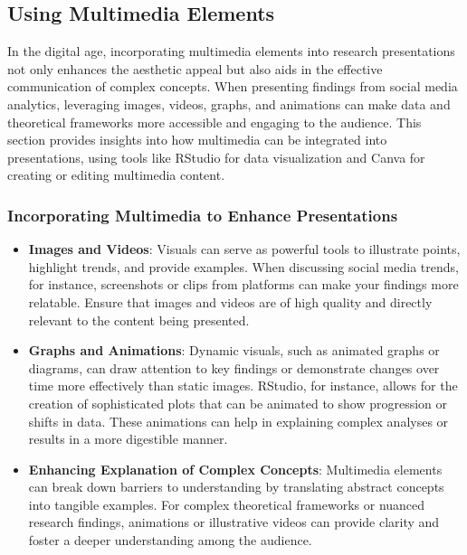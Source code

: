 \documentclass[
]{book}
\begin{document}
\hypertarget{using-multimedia-elements}{%
\subsection*{Using Multimedia Elements}\label{using-multimedia-elements}}

In the digital age, incorporating multimedia elements into research presentations not only enhances the aesthetic appeal but also aids in the effective communication of complex concepts. When presenting findings from social media analytics, leveraging images, videos, graphs, and animations can make data and theoretical frameworks more accessible and engaging to the audience. This section provides insights into how multimedia can be integrated into presentations, using tools like RStudio for data visualization and Canva for creating or editing multimedia content.

\hypertarget{incorporating-multimedia-to-enhance-presentations}{%
\subsubsection{Incorporating Multimedia to Enhance Presentations}\label{incorporating-multimedia-to-enhance-presentations}}

\begin{itemize}
\item
  \textbf{Images and Videos}: Visuals can serve as powerful tools to illustrate points, highlight trends, and provide examples. When discussing social media trends, for instance, screenshots or clips from platforms can make your findings more relatable. Ensure that images and videos are of high quality and directly relevant to the content being presented.
\item
  \textbf{Graphs and Animations}: Dynamic visuals, such as animated graphs or diagrams, can draw attention to key findings or demonstrate changes over time more effectively than static images. RStudio, for instance, allows for the creation of sophisticated plots that can be animated to show progression or shifts in data. These animations can help in explaining complex analyses or results in a more digestible manner.
\item
  \textbf{Enhancing Explanation of Complex Concepts}: Multimedia elements can break down barriers to understanding by translating abstract concepts into tangible examples. For complex theoretical frameworks or nuanced research findings, animations or illustrative videos can provide clarity and foster a deeper understanding among the audience.
\end{itemize}
\end{document}
